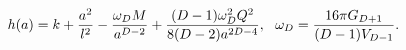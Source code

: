 \begin{equation}
h(a) = k + {a^2\over l^2} - {\omega_D M\over {a^{D-2}}} + {(D-1) \omega_D^2
      Q^2 \over{8 (D-2) a^{2 D -4}}}, ~~\omega_D = {16 \pi
      G_{D+1}\over{(D-1) V_{D-1}}}.
\label{valueh}
\end{equation}

